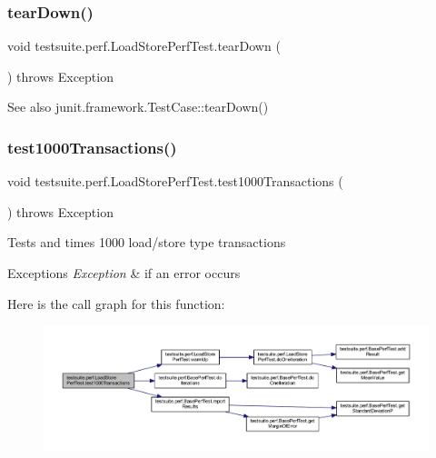 \subsubsection{\texorpdfstring{tear\+Down()}{tearDown()}}
{\footnotesize\ttfamily void testsuite.\+perf.\+Load\+Store\+Perf\+Test.\+tear\+Down (\begin{DoxyParamCaption}{ }\end{DoxyParamCaption}) throws Exception}

\begin{DoxySeeAlso}{See also}
junit.\+framework.\+Test\+Case\+::tear\+Down() 
\end{DoxySeeAlso}
\mbox{\label{classtestsuite_1_1perf_1_1_load_store_perf_test_a0092e8eee45c82e1e740f52b0e93cd42}} 
\subsubsection{\texorpdfstring{test1000\+Transactions()}{test1000Transactions()}}
{\footnotesize\ttfamily void testsuite.\+perf.\+Load\+Store\+Perf\+Test.\+test1000\+Transactions (\begin{DoxyParamCaption}{ }\end{DoxyParamCaption}) throws Exception}

Tests and times 1000 load/store type transactions


\begin{DoxyExceptions}{Exceptions}
{\em Exception} & if an error occurs \\
\hline
\end{DoxyExceptions}
Here is the call graph for this function\+:
\nopagebreak
\begin{figure}[H]
\begin{center}
\leavevmode
\includegraphics[width=350pt]{classtestsuite_1_1perf_1_1_load_store_perf_test_a0092e8eee45c82e1e740f52b0e93cd42_cgraph}
\end{center}
\end{figure}
\mbox{\label{classtestsuite_1_1perf_1_1_load_store_perf_test_aedfa3a61f8e71a59e738a6b6e9d27d0e}} 
